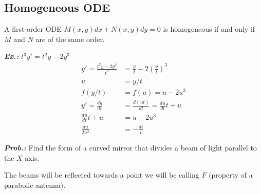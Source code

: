 \documentclass[a4paper]{article}
\begin{document}
\subsection{Homogeneous ODE}


A first-order ODE $M(x,y)dx+N(x,y)dy=0$ is homogeneous if and only if $M$ and $N$ are of the same order.


\textit{\textbf{Ex.:}} $t^{3}y'=t^{2}y-2y^{3}$
\begin{align} 
y'=\frac{t^{2}y-2y^{3}}{t^{3}}&=\frac{y}{t}-2\left( \frac{y}{t} \right)^{3} \\
u&=y / t \\
f(y / t)&=f(u)=u-2u^{3} \\
y'=\frac{dy}{dt}&=\frac{d(ut)}{dt}=\frac{du}{dt}t+u \\
\frac{du}{dt}t+u&=u-2u^{3} \\
\frac{du}{2u^{3}}&=-\frac{dt}{t}
\end{align}

\textit{\textbf{Prob.:}} Find the form of a curved mirror that divides a beam of light parallel to the $X$ axis.

The beams will be reflected towards a point we will be calling $F$ (property of a parabolic antenna).
\end{document}
